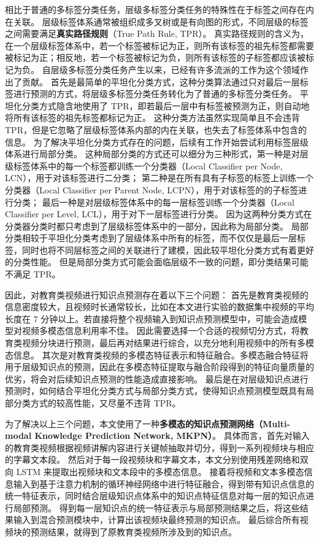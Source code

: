     相比于普通的多标签分类任务，层级多标签分类任务的特殊性在于标签之间存在内在关联。
    层级标签体系通常被组织成多叉树或是有向图的形式，不同层级的标签之间需要满足\textbf{真实路径规则}（True Path Rule, TPR）\cite{Valentini2009TruePR}。
    真实路径规则的含义为，在一个层级标签体系中，若一个标签被标记为正，则所有该标签的祖先标签都需要被标记为正；相反地，若一个标签被标记为负，则所有该标签的子标签都应该被标记为负。
    自层级多标签分类任务产生以来，已经有许多流派的工作为这个领域作出了贡献。
    首先是最简单的平坦化分类方式，这种分类算法通过只对最后一层标签\cite{Barbedo2007AutomaticGC}进行预测的方式，将层级多标签分类任务转化为了普通的多标签分类任务。
    平坦化分类方式隐含地使用了 TPR，即若最后一层中有标签被预测为正，则自动地将所有该标签的祖先标签都标记为正。
    这种分类方法虽然实现简单且不会违背 TPR，但是它忽略了层级标签体系内部的内在关联，也失去了标签体系中包含的信息。
    为了解决平坦化分类方式存在的问题，后续有工作开始尝试利用标签层级体系进行局部分类。
    这种局部分类的方式还可以细分为三种形式，第一种是对层级标签体系中的每一个标签都训练一个分类器（Local Classifier per Node, LCN）\cite{CesaBianchi2004IncrementalAF}，用于对该标签进行二分类；
    第二种是在所有具有子标签的标签上训练一个分类器（Local Classifier per Parent Node, LCPN）\cite{Secker2007AnEC}，用于对该标签的的子标签进行分类；
    最后一种是对层级标签体系中的每一层标签训练一个分类器（Local Classifier per Level, LCL）\cite{Freitas2007ATO}，用于对下一层标签进行分类。
    因为这两种分类方式在分类器分类时都只考虑到了层级标签体系中的一部分，因此称为局部分类。
    局部分类相较于平坦化分类考虑到了层级体系中所有的标签，而不仅仅是最后一层标签，同时也将不同层标签之间的关联进行了建模，因此较平坦化分类方式有着更好的分类性能。
    但是局部分类方式可能会面临层级不一致的问题，即分类结果可能不满足 TPR。

    因此，对教育类视频进行知识点预测存在着以下三个问题：
    首先是教育类视频的信息密度较大，且视频时长通常较长，比如在本文进行实验的数据集中视频的平均长度在 7 分钟以上。若直接将整个视频输入到知识点预测模型中，可能会造成模型对视频多模态信息利用率不佳。
    因此需要选择一个合适的视频切分方式，将教育类视频分块进行预测，最后再对结果进行综合，以充分地利用视频中的所有多模态信息。
    其次是对教育类视频的多模态特征表示和特征融合。多模态融合特征将用于层级知识点的预测，因此在多模态特征提取与融合阶段得到的特征向量质量的优劣，将会对后续知识点预测的性能造成直接影响。
    最后是在对层级知识点进行预测时，如何结合平坦化分类方式与局部分类方式，使得知识点预测模型既具有局部分类方式的较高性能，又尽量不违背 TPR。

    为了解决以上三个问题，本文使用了一种\textbf{多模态的知识点预测网络（Multi-modal Knowledge Prediction Network, MKPN）}。
    具体而言，首先对输入的教育类视频根据视频讲解内容进行关键帧抽取并切分，得到一系列视频块与相应的字幕文本段。
    然后对于每一段视频块和字幕文本，本文分别使用残差网络和双向 LSTM 来提取出视频块和文本段中的多模态信息。
    接着将视频和文本多模态信息输入到基于注意力机制的循环神经网络中进行特征融合，得到带有知识点信息的统一特征表示，同时结合层级知识点体系中的知识点特征信息对每一层的知识点进行局部预测。
    得到每一层知识点的统一特征表示与局部预测结果之后，将这些结果输入到混合预测模块中，计算出该视频块最终预测的知识点。
    最后综合所有视频块的预测结果，就得到了原教育类视频所涉及到的知识点。

